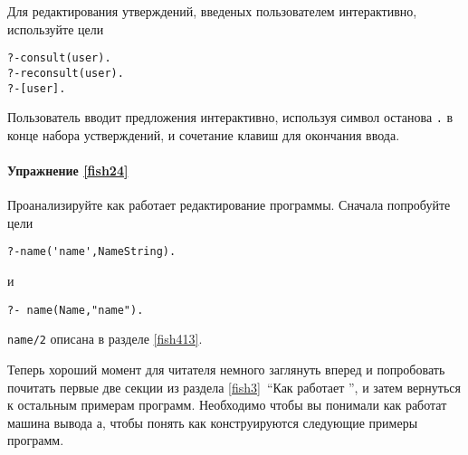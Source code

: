 Для редактирования утверждений, введеных пользователем интерактивно, используйте
цели

\begin{verbatim}
?-consult(user).
?-reconsult(user).
?-[user].  
\end{verbatim}
Пользователь вводит предложения интерактивно, используя символ останова \verb'.'
в конце набора устверждений, и сочетание клавиш  для окончания
ввода.

\paragraph{Упражнение \ref{fish24}} Проанализируйте как работает
редактирование программы. Сначала попробуйте цели

\begin{verbatim}
?-name('name',NameString). 
\end{verbatim}
и
\begin{verbatim}
?- name(Name,"name").
\end{verbatim}
\verb|name/2| описана в разделе \ref{fish413}.

\bigskip
Теперь хороший момент для читателя немного заглянуть вперед и попробовать
почитать первые две секции из раздела \ref{fish3}\ ``Как работает \prolog'',
и затем вернуться к остальным примерам программ. Необходимо чтобы вы понимали
как работат машина вывода \prolog а, чтобы понять как конструируются следующие
примеры программ.